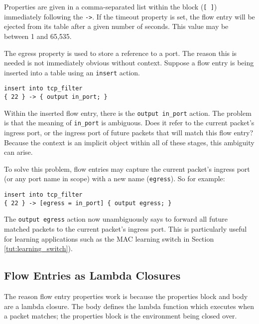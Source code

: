 Properties are given in a comma-separated list within the block (\texttt{[ ]}) 
immediately following the \texttt{->}. 
If the timeout property is set, the flow entry will be ejected from its table
after a given number of seconds. This value may be between 1 and 65,535.

The egress property is used to store a reference to a port.
The reason this is needed is not immediately obvious without context.
Suppose a flow entry is being inserted into a table using an
\texttt{insert} action.

\begin{codepage}
\begin{lstlisting}
insert into tcp_filter
{ 22 } -> { output in_port; }
\end{lstlisting}
\end{codepage}

Within the inserted flow entry, there is the \texttt{output in\_port} action.
The problem is that the meaning of \texttt{in\_port} is ambiguous. 
Does it refer to the current packet's ingress port, or the ingress port of
future packets that will match this flow entry? Because the context is
an implicit object within all of these stages, this ambiguity can
arise.

To solve this problem, flow entries may capture the current packet's ingress
port (or any port name in scope) with a new name (\texttt{egress}). So for example:

\begin{codepage}
\begin{lstlisting}
insert into tcp_filter
{ 22 } -> [egress = in_port] { output egress; }
\end{lstlisting}
\end{codepage}

The \texttt{output egress} action now unambiguously says to forward all future
matched packets to the current packet's ingress port.
This is particularly useful for learning applications such as the MAC learning switch in Section
\ref{tut:learning_switch}).

\subsection{Flow Entries as Lambda Closures}

The reason flow entry properties work is because the properties block and body are a lambda closure. 
The body defines the lambda function which executes when a packet matches; the properties block is the environment being closed over.

